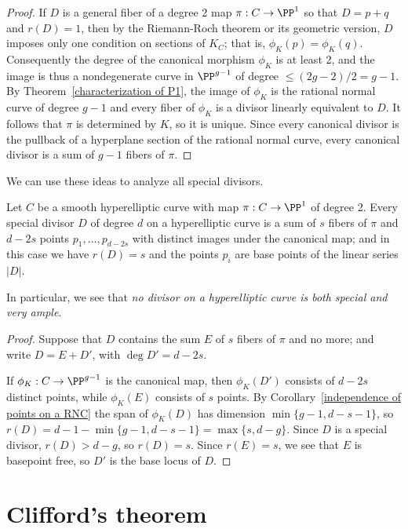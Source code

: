 \begin{proof}
If $D$ is a general fiber of a degree 2 map $\pi:C\to \PP^1$ so that $D= p+q$ and $r(D) = 1$, then by the Riemann-Roch theorem or its geometric version, $D$ imposes only one condition on sections of $K_C$; that is, $\phi_K(p) = \phi_K(q)$. Consequently the degree of the canonical morphism $\phi_K$ is at least 2, and the image is thus a nondegenerate curve in $\PP^{g-1}$ of degree $\leq (2g-2)/2 = g-1$. By Theorem~\ref{characterization of P1}, the image of $\phi_K$ is the rational normal curve of degree $g-1$ and every fiber of $\phi_K$ is a divisor linearly equivalent to $D$. It follows that $\pi$ is determined by $K$, so it is unique. Since every canonical divisor is the pullback of a hyperplane section of the rational normal curve,
every canonical divisor is a sum of $g-1$ fibers of $\pi$.
\end{proof}

We can use these ideas to analyze all special divisors.

\begin{corollary}\label{special on hyperelliptic} Let $C$ be a smooth hyperelliptic curve with map $\pi: C\to \PP^1$ of degree 2.
Every special divisor $D$ of degree $d$ on a hyperelliptic curve is a sum of $s$ fibers of $\pi$ and $d-2s$ points $p_1,\dots,p_{d-2s}$ with distinct images under the canonical map; and in this case we have $r(D) = s$ and the points $p_i$ are base points of the linear series $|D|$.
\end{corollary}

In particular, we see that \emph{no divisor on a hyperelliptic curve is both special and very ample}.

\begin{proof}
Suppose that $D$ contains the sum $E$ of $s$ fibers of $\pi$ and no more; and write $D = E+D'$, with $\deg D' = d-2s$.
 
If $\phi_K:C \to \PP^{g-1}$ is the canonical map, then $\phi_K(D')$ consists of $d-2s$ distinct points, while $\phi_K(E)$ consists of
$s$ points. By Corollary~\ref{independence of points on a RNC} the span of $\phi_K(D)$ has dimension $\min\{g-1, d-s-1\}$, so 
$r(D) = d-1-\min\{g-1, d-s-1\} = \max \{s,d-g\}$. Since $D$ is a special divisor, $r(D) > d-g$, so $r(D) = s$. 
Since $r(E) =s$, we see that $E$ is basepoint free, so $D'$ is the base locus of $D$.
\end{proof}

\section{Clifford's theorem}

